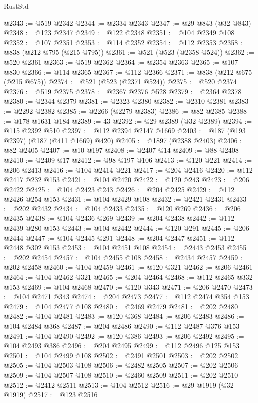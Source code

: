 \begin{lexlean}{RustStd}
\begin{coremodule}
{\begin{coremodule}
{{{{{{{{{{{{{{{{{{{{{{{{{{{{{{{{{{{{{{{{{{{{{{{{{{{{{{{@2343 := @519 @2342
@2344 := @2334 @2343
@2347 := @29 @843 (@32 @843)
@2348 := @123 @2347
@2349 := @122 @2348
@2351 := @104 @2349 @108
@2352 := @107 @2351
@2353 := @114 @2352
@2354 := @112 @2353
@2358 := @838 (@212 @795 (@215 @795))
@2361 := @521 (@523 (@2358 @524))
@2362 := @520 @2361
@2363 := @519 @2362
@2364 := @2354 @2363
@2365 := @107 @830
@2366 := @114 @2365
@2367 := @112 @2366
@2371 := @838 (@212 @675 (@215 @675))
@2374 := @521 (@523 (@2371 @524))
@2375 := @520 @2374
@2376 := @519 @2375
@2378 := @2367 @2376 @528
@2379 := @2364 @2378
@2380 := @2344 @2379
@2381 := @2323 @2380
@2382 := @2310 @2381
@2383 := @2292 @2382
@2385 := @2266 (@2279 @2383)
@2386 := @82 @2385
@2388 := @178 @1631 @184
@2389 := 43
@2392 := @29 @2389 (@32 @2389)
@2394 := @115 @2392 @510
@2397 := @112 @2394 @2147 @1669
@2403 := @187 (@193 @2397) (@187 (@411 @1669) @420)
@2405 := @1897 (@2388 @2403)
@2406 := @82 @2405
@2407 := @10 @197
@2408 := @2407 @14
@2409 := @88 @2408
@2410 := @2409 @17
@2412 := @98 @197 @106
@2413 := @120 @221
@2414 := @206 @2413
@2416 := @104 @2414 @221
@2417 := @204 @2416
@2420 := @112 @2417 @232 @153
@2421 := @104 @2420
@2422 := @120 @243
@2423 := @206 @2422
@2425 := @104 @2423 @243
@2426 := @204 @2425
@2429 := @112 @2426 @254 @153
@2431 := @104 @2429 @108
@2432 := @2421 @2431
@2433 := @202 @2432
@2434 := @104 @2433
@2435 := @120 @269
@2436 := @206 @2435
@2438 := @104 @2436 @269
@2439 := @204 @2438
@2442 := @112 @2439 @280 @153
@2443 := @104 @2442
@2444 := @120 @291
@2445 := @206 @2444
@2447 := @104 @2445 @291
@2448 := @204 @2447
@2451 := @112 @2448 @302 @153
@2453 := @104 @2451 @108
@2454 := @2443 @2453
@2455 := @202 @2454
@2457 := @104 @2455 @108
@2458 := @2434 @2457
@2459 := @202 @2458
@2460 := @104 @2459
@2461 := @120 @321
@2462 := @206 @2461
@2464 := @104 @2462 @321
@2465 := @204 @2464
@2468 := @112 @2465 @332 @153
@2469 := @104 @2468
@2470 := @120 @343
@2471 := @206 @2470
@2473 := @104 @2471 @343
@2474 := @204 @2473
@2477 := @112 @2474 @354 @153
@2479 := @104 @2477 @108
@2480 := @2469 @2479
@2481 := @202 @2480
@2482 := @104 @2481
@2483 := @120 @368
@2484 := @206 @2483
@2486 := @104 @2484 @368
@2487 := @204 @2486
@2490 := @112 @2487 @376 @153
@2491 := @104 @2490
@2492 := @120 @386
@2493 := @206 @2492
@2495 := @104 @2493 @386
@2496 := @204 @2495
@2499 := @112 @2496 @125 @153
@2501 := @104 @2499 @108
@2502 := @2491 @2501
@2503 := @202 @2502
@2505 := @104 @2503 @108
@2506 := @2482 @2505
@2507 := @202 @2506
@2509 := @104 @2507 @108
@2510 := @2460 @2509
@2511 := @202 @2510
@2512 := @2412 @2511
@2513 := @104 @2512
@2516 := @29 @1919 (@32 @1919)
@2517 := @123 @2516
}}}}}}}}}}}}}}}}}}}}}}}}}}}}}}}}}}}}}}}}}}}}}}}}}}}}}}}
\end{coremodule}}
\end{coremodule}
\end{lexlean}
